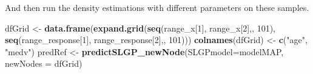 \documentclass[
]{article}
\newenvironment{Shaded}{\begin{snugshade}}{\end{snugshade}}
\newcommand{\AttributeTok}[1]{\textcolor[rgb]{0.13,0.29,0.53}{#1}}
\newcommand{\DecValTok}[1]{\textcolor[rgb]{0.00,0.00,0.81}{#1}}
\newcommand{\FunctionTok}[1]{\textcolor[rgb]{0.13,0.29,0.53}{\textbf{#1}}}
\newcommand{\NormalTok}[1]{#1}
\newcommand{\OtherTok}[1]{\textcolor[rgb]{0.56,0.35,0.01}{#1}}
\newcommand{\StringTok}[1]{\textcolor[rgb]{0.31,0.60,0.02}{#1}}
\begin{document}
And then run the density estimations with different parameters on these samples.

\begin{Shaded}
\begin{Highlighting}[]
\NormalTok{dfGrid }\OtherTok{\textless{}{-}} \FunctionTok{data.frame}\NormalTok{(}\FunctionTok{expand.grid}\NormalTok{(}\FunctionTok{seq}\NormalTok{(range\_x[}\DecValTok{1}\NormalTok{], range\_x[}\DecValTok{2}\NormalTok{],, }\DecValTok{101}\NormalTok{), }
                                 \FunctionTok{seq}\NormalTok{(range\_response[}\DecValTok{1}\NormalTok{], range\_response[}\DecValTok{2}\NormalTok{],, }\DecValTok{101}\NormalTok{)))}
\FunctionTok{colnames}\NormalTok{(dfGrid) }\OtherTok{\textless{}{-}} \FunctionTok{c}\NormalTok{(}\StringTok{"age"}\NormalTok{, }\StringTok{"medv"}\NormalTok{)}
\NormalTok{predRef }\OtherTok{\textless{}{-}} \FunctionTok{predictSLGP\_newNode}\NormalTok{(}\AttributeTok{SLGPmodel=}\NormalTok{modelMAP,}
                               \AttributeTok{newNodes =}\NormalTok{ dfGrid)}


\end{Highlighting}
\end{Shaded}
\end{document}
